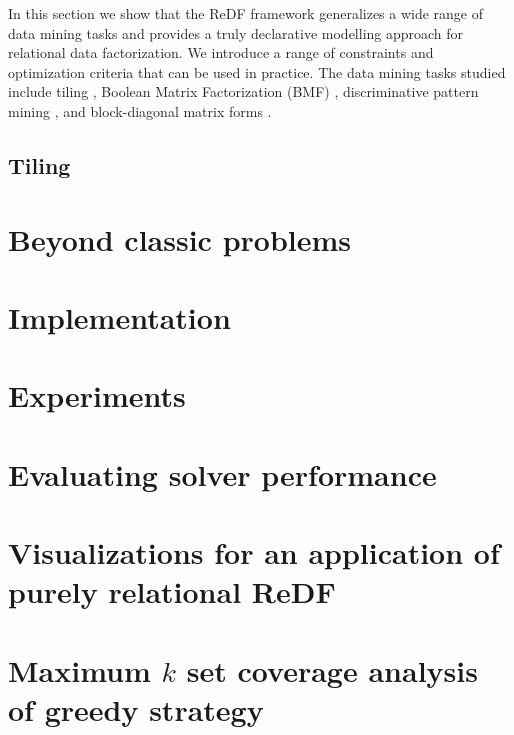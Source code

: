 In this section we show that the ReDF framework generalizes a wide range of data mining tasks and provides a truly declarative modelling approach for relational data factorization. We introduce a range of constraints and optimization criteria that can be used in practice. The data mining tasks studied include tiling \parencite{tiling},  Boolean Matrix Factorization (BMF) \parencite{dbp}, discriminative pattern mining \parencite{DBLP:conf/pkdd/KnobbeH06}, and block-diagonal matrix forms \parencite{blockdiagonal}.%

\subsection{Tiling}
\label{subsection:tiling}

\section{Beyond classic problems}
\label{subsection:beoynd}


\section{Implementation}
\label{section:implementation}


\section{Experiments}
\label{section:experiments}


\section{Evaluating solver performance}  \label{subsec:evaluatingsolver}


\section{Visualizations for an application of purely relational ReDF}\label{appendix:application_purel_relational}

\section{Maximum $k$ set coverage analysis of greedy strategy}\label{appendix:k_set_coverage_analysis}


